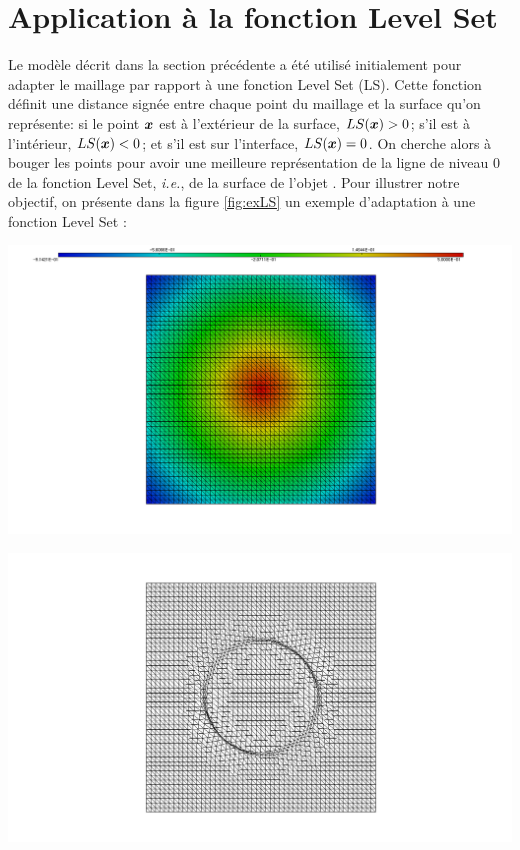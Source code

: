 \section{Application à la fonction Level Set}


\label{sec:application}

\indent Le modèle décrit dans la section précédente a été utilisé initialement pour adapter le maillage par rapport à une fonction Level Set (LS). Cette fonction définit une distance signée entre chaque point du maillage et la surface qu'on représente: si le point \(\boldsymbol{x}\) est à l'extérieur de la surface, \(LS(\boldsymbol{x}) > 0\); s'il est à l'intérieur, \(LS(\boldsymbol{x}) < 0\); et s'il est sur l'interface, \(LS(\boldsymbol{x}) = 0\).  On cherche alors à bouger les points pour avoir une meilleure représentation de la ligne de niveau 0 de la fonction Level Set, \emph{i.e.}, de la surface de l'objet \cite{ducrot}. Pour illustrer notre objectif, on présente dans la figure \ref{fig:exLS} un exemple d'adaptation à une fonction Level Set :

\indent

\begingroup
	\begin{minipage}[t]{.5\linewidth}
		\centering
		\includegraphics[clip=true, trim = 10cm 0 10cm 0, scale=.25]{Bordeaux/figures/LSinit.png}
	\end{minipage}
	\hfill
	\begin{minipage}[t]{.5\linewidth}
		\centering
		\includegraphics[clip=true, trim = 10cm 0 10cm 0, scale=.25]{Bordeaux/figures/LSadapt.png}
	\end{minipage}
\endgroup

